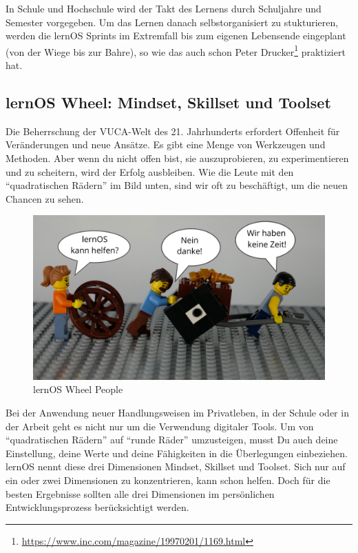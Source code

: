 \documentclass[
  ngerman,
  paper=a4,
,captions=tableheading
]{scrartcl}
\DeclareRobustCommand{\href}[2]{#2\footnote{\url{#1}}}
\begin{document}
In Schule und Hochschule wird der Takt des Lernens durch Schuljahre und
Semester vorgegeben. Um das Lernen danach selbstorganisiert zu
stukturieren, werden die lernOS Sprints im Extremfall bis zum eigenen
Lebensende eingeplant (von der Wiege bis zur Bahre), so wie das
\href{https://www.inc.com/magazine/19970201/1169.html}{auch schon Peter
Drucker} praktiziert hat.

\hypertarget{lernos-wheel-mindset-skillset-und-toolset}{%
\subsection{lernOS Wheel: Mindset, Skillset und
Toolset}\label{lernos-wheel-mindset-skillset-und-toolset}}

Die Beherrschung der VUCA-Welt des 21. Jahrhunderts erfordert Offenheit
für Veränderungen und neue Ansätze. Es gibt eine Menge von Werkzeugen
und Methoden. Aber wenn du nicht offen bist, sie auszuprobieren, zu
experimentieren und zu scheitern, wird der Erfolg ausbleiben. Wie die
Leute mit den ``quadratischen Rädern'' im Bild unten, sind wir oft zu
beschäftigt, um die neuen Chancen zu sehen.

\begin{figure}
\centering
\includegraphics{./tex2pdf.-c0ed5a8631023970/df19bf99afbb44721e135e9eea2ed49ab82560e2.png}
\caption{lernOS Wheel People}
\end{figure}

Bei der Anwendung neuer Handlungsweisen im Privatleben, in der Schule
oder in der Arbeit geht es nicht nur um die Verwendung digitaler Tools.
Um von ``quadratischen Rädern'' auf ``runde Räder'' umzusteigen, musst
Du auch deine Einstellung, deine Werte und deine Fähigkeiten in die
Überlegungen einbeziehen. lernOS nennt diese drei Dimensionen Mindset,
Skillset und Toolset. Sich nur auf ein oder zwei Dimensionen zu
konzentrieren, kann schon helfen. Doch für die besten Ergebnisse sollten
alle drei Dimensionen im persönlichen Entwicklungsprozess berücksichtigt
werden.
\end{document}
